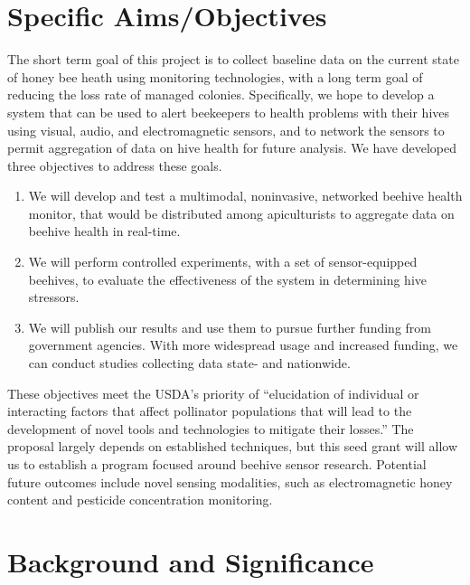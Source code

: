 
\section{Specific Aims/Objectives}

The short term goal of this project is to collect baseline data on the current state of honey bee heath using monitoring technologies, with a long term goal of reducing the loss rate of managed colonies. Specifically, we hope to develop a system that can be used to alert beekeepers to health problems with their hives using visual, audio, and electromagnetic sensors, and to network the sensors to permit aggregation of data on hive health for future analysis. We have developed three objectives to address these goals.

\begin{enumerate}
\item We will develop and test a multimodal, noninvasive, networked beehive health monitor, that would be distributed among apiculturists to aggregate data on beehive health in real-time.
\item We will perform controlled experiments, with a set of sensor-equipped beehives, to evaluate the effectiveness of the system in determining hive stressors.
\item We will publish our results and use them to pursue further funding from government agencies. With more widespread usage and increased funding, we can conduct studies collecting data state- and nationwide.
\end{enumerate}

These objectives meet the USDA’s priority of “elucidation of individual or interacting factors that affect pollinator populations that will lead to the development of novel tools and technologies to mitigate their losses.” The proposal largely depends on established techniques, but this seed grant will allow us to establish a program focused around beehive sensor research. Potential future outcomes include novel sensing modalities, such as electromagnetic honey content and pesticide concentration monitoring.

\section{Background and Significance}

